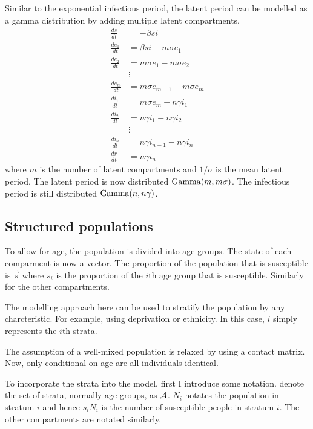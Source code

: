 \documentclass[thesis.tex]{subfiles}
\begin{document}
Similar to the exponential infectious period, the latent period can be modelled as a gamma distribution by adding multiple latent compartments.
\begin{align}
\frac{ds}{dt} &= -\beta si \\
\frac{de_1}{dt} &= \beta si - m\sigma e_1 \\
\frac{de_2}{dt} &= m\sigma e_1 - m \sigma e_2 \\
&\vdots \nonumber \\
\frac{de_m}{dt} &= m\sigma e_{m-1} - m \sigma e_m \\
\frac{di_1}{dt} &= m\sigma e_m - n\gamma i_1 \\
\frac{di_2}{dt} &= n\gamma i_1 - n \gamma i_2 \\
&\vdots \nonumber \\
\frac{di_n}{dt} &= n\gamma i_{n-1} - n \gamma i_n \\
\frac{dr}{dt} &= n\gamma i_n
\end{align}
where $m$ is the number of latent compartments and $1/\sigma$ is the mean latent period.
The latent period is now distributed $\operatorname{Gamma}(m, m\sigma)$.
The infectious period is still distributed $\operatorname{Gamma}(n, n\gamma)$.


\subsection{Structured populations}


To allow for age, the population is divided into age groups.
The state of each comparment is now a vector.
The proportion of the population that is susceptible is $\vec{s}$ where $s_i$ is the proportion of the $i$th age group that is susceptible.
Similarly for the other compartments.

The modelling approach here can be used to stratify the population by any charcteristic.
For example, using deprivation or ethnicity.
In this case, $i$ simply represents the $i$th strata.

The assumption of a well-mixed population is relaxed by using a contact matrix.
Now, only conditional on age are all individuals identical.

To incorporate the strata into the model, first I introduce some notation.
denote the set of strata, normally age groups, as $\mathcal{A}$. $N_i$ notates the population in stratum $i$ and hence $s_i N_i$ is the number of susceptible people in stratum $i$.
The other compartments are notated similarly.
\end{document}
